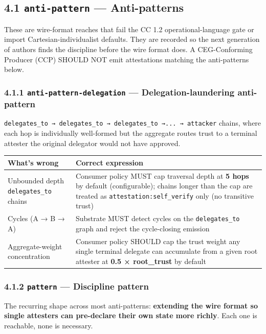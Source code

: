 \documentclass[11pt]{article}
\begin{document}
\subsection*{4.1 \texttt{anti-pattern} — Anti-patterns}


These are wire-format reaches that fail the CC 1.2 operational-language gate or import Cartesian-individualist defaults. They are recorded so the next generation of authors finds the discipline before the wire format does. A CEG-Conforming Producer (CCP) SHOULD NOT emit attestations matching the anti-patterns below.


\subsubsection*{4.1.1 \texttt{anti-pattern-delegation} — Delegation-laundering anti-pattern}


\texttt{delegates\_to → delegates\_to → delegates\_to →... → attacker} chains, where each hop is individually well-formed but the aggregate routes trust to a terminal attester the original delegator would not have approved.


{\footnotesize
\begin{longtable}{|p{8.0cm}|p{8.0cm}|}\hline
\textbf{What's wrong} & \textbf{Correct expression} \\ \hline\endhead
Unbounded depth \texttt{delegates\_to} chains & Consumer policy MUST cap traversal depth at \textbf{5 hops} by default (configurable); chains longer than the cap are treated as \texttt{attestation:self\_verify} only (no transitive trust) \\ \hline
Cycles (A → B → A) & Substrate MUST detect cycles on the \texttt{delegates\_to} graph and reject the cycle-closing emission \\ \hline
Aggregate-weight concentration & Consumer policy SHOULD cap the trust weight any single terminal delegate can accumulate from a given root attester at \textbf{0.5 × root\_trust} by default \\ \hline
\end{longtable}}


\subsubsection*{4.1.2 \texttt{pattern} — Discipline pattern}


The recurring shape across most anti-patterns: \textbf{extending the wire format so single attesters can pre-declare their own state more richly}. Each one is reachable, none is necessary.
\end{document}
